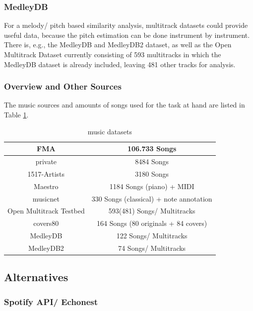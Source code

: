 \subsubsection{MedleyDB}

For a melody/ pitch based similarity analysis, multitrack datasets could provide useful data, because the pitch estimation can be done instrument by instrument. There is, e.g., the MedleyDB \cite{medleydb1} and MedleyDB2 \cite{medleydb2} dataset, as well as the Open Multitrack Dataset \cite{openmult1} currently consisting of 593 multitracks in which the MedleyDB dataset is already included, leaving 481 other tracks for analysis.

\subsubsection{Overview and Other Sources}

The music sources and amounts of songs used for the task at hand are listed in Table \ref{table_dsets}.

\begin{table}[h]
	\begin{center}
		\begin{tabular}{|c||c|}
			\hline
			FMA & 106.733 Songs\\
			\hline
			private & 8484 Songs\\
			\hline
			1517-Artists & 3180 Songs\\
			\hline
			Maestro & 1184 Songs (piano) + MIDI\\
			\hline
			musicnet & 330 Songs (classical) + note annotation\\
			\hline
			Open Multitrack Testbed & 593(481) Songs/ Multitracks\\
			\hline
			covers80 & 164 Songs (80 originals + 84 covers)\\
			\hline
			MedleyDB &  122 Songs/ Multitracks\\
			\hline
			MedleyDB2 &  74 Songs/ Multitracks\\
			\hline
		\end{tabular}
	\end{center}
	\caption{music datasets}
	\label{table_dsets}
\end{table}
\FloatBarrier

\subsection{Alternatives}

\subsubsection{Spotify API/ Echonest}\label{spotipy}

